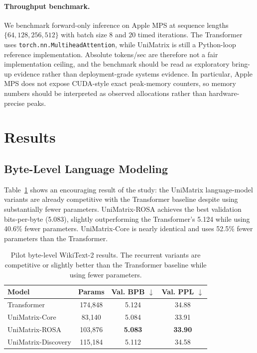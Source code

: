 \documentclass[11pt]{article}
\begin{document}
\paragraph{Throughput benchmark.}
We benchmark forward-only inference on Apple MPS at sequence lengths
$\{64, 128, 256, 512\}$ with batch size $8$ and $20$ timed iterations. The
Transformer uses \texttt{torch.nn.MultiheadAttention}, while UniMatrix is still
a Python-loop reference implementation. Absolute tokens/sec are therefore not a
fair implementation ceiling, and the benchmark should be read as exploratory
bring-up evidence rather than deployment-grade systems evidence. In
particular, Apple MPS does not expose CUDA-style exact peak-memory counters, so
memory numbers should be interpreted as observed allocations rather than
hardware-precise peaks.

\section{Results}
\subsection{Byte-Level Language Modeling}
Table~\ref{tab:lm} shows an encouraging result of the study: the
UniMatrix language-model variants are already competitive with the Transformer
baseline despite using substantially fewer parameters. UniMatrix-ROSA achieves
the best validation bits-per-byte (5.083), slightly outperforming the
Transformer's 5.124 while using 40.6\% fewer parameters. UniMatrix-Core is
nearly identical and uses 52.5\% fewer parameters than the Transformer.

\begin{table}[t]
\centering
\begin{tabular}{lccc}
\toprule
Model & Params & Val. BPB $\downarrow$ & Val. PPL $\downarrow$ \\
\midrule
Transformer & 174{,}848 & 5.124 & 34.88 \\
UniMatrix-Core & 83{,}140 & 5.084 & 33.91 \\
UniMatrix-ROSA & 103{,}876 & \textbf{5.083} & \textbf{33.90} \\
UniMatrix-Discovery & 115{,}184 & 5.112 & 34.58 \\
\bottomrule
\end{tabular}
\caption{Pilot byte-level WikiText-2 results. The recurrent variants are
competitive or slightly better than the Transformer baseline while using fewer
parameters.}
\label{tab:lm}
\end{table}
\end{document}

